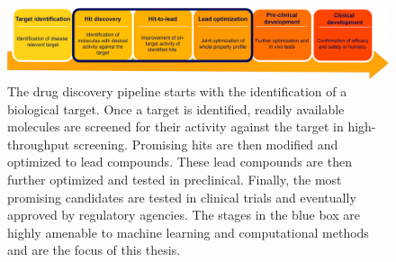 \begin{figure}
    \centering
    \includegraphics[width=\textwidth]{figures/drug-discovery-pipeline.pdf}
    \caption{The drug discovery pipeline starts with the identification of a
    biological target. Once a target is identified, readily available molecules
    are screened for their activity against the target in high-throughput
    screening. Promising hits are then modified and optimized to lead compounds.
    These lead compounds are then further optimized and tested in preclinical.
    Finally, the most promising candidates are tested in clinical trials and
    eventually approved by regulatory agencies. The stages in the blue box are
    highly amenable to machine learning and computational methods and are the
    focus of this thesis. \label{fig:drug-discovery-pipeline}}
\end{figure}

